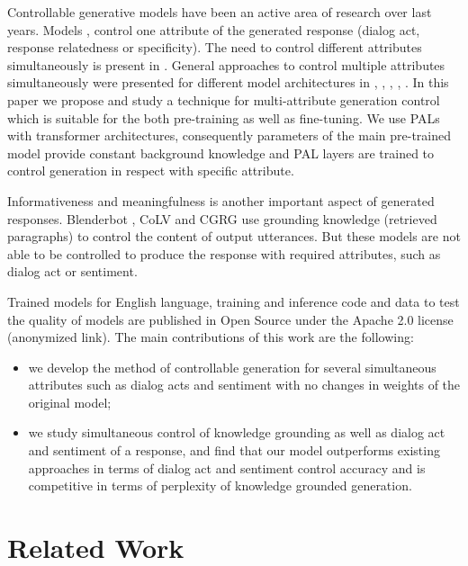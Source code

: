 \documentclass[11pt]{article}
\begin{document}
Controllable generative models have been an active area of research over last years. Models \cite{zhao2017learning}, \cite{zhang2018learning} control one attribute of the generated response (dialog act, response relatedness or specificity). The need to control different attributes simultaneously is present in \cite{see2019makes}. General approaches to control multiple attributes simultaneously were presented for different model architectures in \cite{hu2021controllable}, \cite{neural_meta_words}, \cite{attr_alignment}, \cite{side_control}, \cite{phed}. In this paper we propose and study a technique for multi-attribute generation control which is suitable for the both pre-training as well as fine-tuning. We use PALs \cite{stickland2019bert} with transformer architectures, consequently parameters of the main pre-trained model provide constant background knowledge and PAL layers are trained to control generation in respect with specific attribute.

Informativeness and meaningfulness is another important aspect of generated responses. Blenderbot \cite{roller2020recipes}, CoLV \cite{zhan2021colv} and CGRG \cite{wu2021controllable} use grounding knowledge (retrieved paragraphs) to control the content of output utterances. But these models are not able to be controlled to produce the response with required attributes, such as dialog act or sentiment.

Trained models for English language, training and inference code and data to test the quality of models are published in Open Source under the Apache 2.0 license (anonymized link). The main contributions of this work are the following:
\begin{itemize}
    \item we develop the method of controllable generation for several simultaneous attributes such as dialog acts and sentiment with no changes in weights of the original model;
    \item we study simultaneous control of knowledge grounding as well as dialog act and sentiment of a response, and find that our model outperforms existing approaches in terms of dialog act and sentiment control accuracy and is competitive in terms of perplexity of knowledge grounded generation.
\end{itemize}

\section{Related Work}
\end{document}
